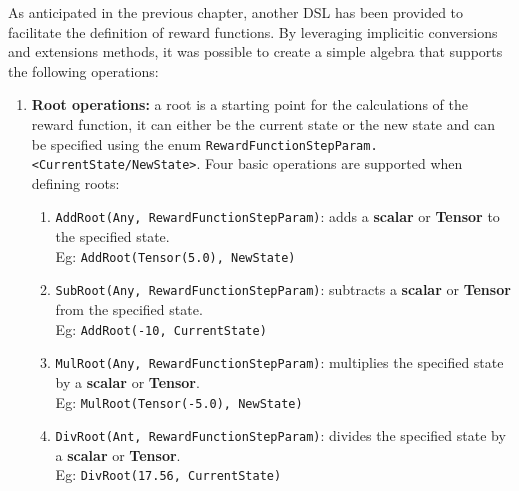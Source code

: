 \documentclass[12pt,a4paper,openright,twoside]{book}
\begin{document}
As anticipated in the previous chapter, another DSL has been provided to facilitate the definition of reward functions. By leveraging implicitic conversions and extensions methods, it was possible to create a simple algebra that supports the following operations:
\begin{enumerate}
    \item \textbf{Root operations:} 
          a root is a starting point for the calculations of the reward function, 
          it can either be the current state or the new state and can be specified 
          using the enum \lstinline{RewardFunctionStepParam.<CurrentState/NewState>}. 
          Four basic operations are supported when defining roots:
          \begin{enumerate}
              \item \lstinline{AddRoot(Any, RewardFunctionStepParam)}: 
                    adds a \textbf{scalar} or \textbf{Tensor} to the specified state. \\
                    Eg: \lstinline{AddRoot(Tensor(5.0), NewState)}
              \item \lstinline{SubRoot(Any, RewardFunctionStepParam)}: 
                    subtracts a \textbf{scalar} or \textbf{Tensor} from the specified state. \\
                    Eg: \lstinline{AddRoot(-10, CurrentState)}
              \item \lstinline{MulRoot(Any, RewardFunctionStepParam)}: 
                    multiplies the specified state by a \textbf{scalar} or \textbf{Tensor}. \\
                    Eg: \lstinline{MulRoot(Tensor(-5.0), NewState)}
              \item \lstinline{DivRoot(Ant, RewardFunctionStepParam)}: 
                    divides the specified state by a \textbf{scalar} or \textbf{Tensor}. \\
                    Eg: \lstinline{DivRoot(17.56, CurrentState)}
          \end{enumerate}
          

\end{enumerate}
\end{document}

